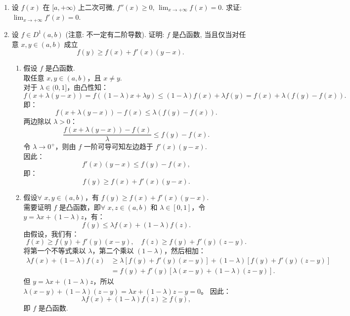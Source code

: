 \begin{enumerate}
    \item[5.]设 \(f(x)\) 在 \([a, +\infty)\) 上二次可微, \(\displaystyle f''(x) \geq 0\), \(\displaystyle\lim_{x \to +\infty} f(x) = 0\). 
    求证: \(\displaystyle \lim_{x \to +\infty} f'(x) = 0\).
    \item[6.]设 \(\displaystyle f \in D^1 (a,b)\) (注意: 不一定有二阶导数). 证明: \(f\) 是凸函数, 当且仅当对任意 \(x,y \in (a,b)\) 成立
    \[f(y) \geq f(x) + f'(x)(y - x).\]
    \begin{solution}
        \begin{enumerate}
        \item[i.] 假设 \( f \) 是凸函数.\\
        取任意 \( x, y \in (a,b) \)，且 \( x \neq y \).\\
        对于 \( \lambda \in (0,1] \)，由凸性知：
        \[
        f(x + \lambda (y - x))=f((1-\lambda)x+\lambda y) \leq (1-\lambda)f(x)+\lambda f(y) =f(x) + \lambda (f(y) - f(x)).
        \]
        即：
        \[
        f(x + \lambda (y - x)) - f(x) \leq \lambda (f(y) - f(x)).
        \]
        两边除以 \( \lambda>0 \)：
        \[
        \frac{f(x + \lambda (y - x)) - f(x)}{\lambda} \leq f(y) - f(x).
        \]
        令 \( \lambda \to 0^+ \)，则由 $f$ 一阶可导可知左边趋于 \( f'(x)(y - x) \).\\
        因此：
        \[
        f'(x)(y - x) \leq f(y) - f(x),
        \]
        即：
        \[
        f(y) \geq f(x) + f'(x)(y - x).
        \]

        \item[ii.] 假设$\forall$ \( x,y \in (a,b) \)，有 \( f(y) \geq f(x) + f'(x)(y - x) \).\\
        需要证明 \( f \) 是凸函数，即$\forall$ \( x,z \in (a,b) \) 和 \( \lambda \in [0,1] \)，令 \( y = \lambda x + (1-\lambda) z \)，有：
        \[
        f(y) \leq \lambda f(x) + (1-\lambda) f(z).
        \]
        由假设，我们有：
        \[
        f(x) \geq f(y) + f'(y)(x - y), \quad f(z) \geq f(y) + f'(y)(z - y).
        \]
        将第一个不等式乘以 \( \lambda \)，第二个乘以 \( (1-\lambda) \)，然后相加：
        \[
        \begin{aligned}
        \lambda f(x) + (1-\lambda) f(z) &\geq \lambda [f(y) + f'(y)(x - y)] + (1-\lambda) [f(y) + f'(y)(z - y)] \\
        &= f(y) + f'(y) [\lambda (x - y) + (1-\lambda)(z - y)].
        \end{aligned}
        \]
        但 \( y = \lambda x + (1-\lambda) z \)，所以 \( \lambda (x - y) + (1-\lambda)(z - y) = \lambda x + (1-\lambda) z - y = 0 \)。  
        因此：
        \[
        \lambda f(x) + (1-\lambda) f(z) \geq f(y),
        \]
        即 \( f \) 是凸函数.
        \end{enumerate}
    \end{solution}


\end{enumerate}
